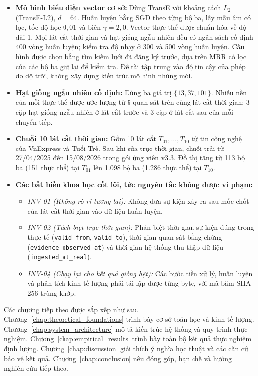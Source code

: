 \begin{itemize}
    \item \textbf{Mô hình biểu diễn vector cơ sở:} Dùng TransE với khoảng cách $L_2$ (TransE-L2), $d=64$. Huấn luyện bằng SGD theo từng bộ ba, lấy mẫu âm có lọc, tốc độ học $0{,}01$ và biên $\gamma = 2{,}0$. Vector thực thể được chuẩn hóa về độ dài 1. Mọi lát cắt thời gian và hạt giống ngẫu nhiên đều có ngân sách cố định 400 vòng huấn luyện; kiểm tra độ nhạy ở 300 và 500 vòng huấn luyện. Cấu hình được chọn bằng tìm kiếm lưới đã đăng ký trước, dựa trên MRR có lọc của các bộ ba giữ lại để kiểm tra. Đề tài tập trung vào độ tin cậy của phép đo độ trôi, không xây dựng kiến trúc mô hình nhúng mới.
    \item \textbf{Hạt giống ngẫu nhiên cố định:} Dùng ba giá trị $\{13, 37, 101\}$. Nhiễu nền của mỗi thực thể được ước lượng từ 6 quan sát trên cùng lát cắt thời gian: 3 cặp hạt giống ngẫu nhiên ở lát cắt trước và 3 cặp ở lát cắt sau của mỗi chuyển tiếp.
    \item \textbf{Chuỗi 10 lát cắt thời gian:} Gồm 10 lát cắt $T_{01}, \dots, T_{10}$ từ tin công nghệ của VnExpress và Tuổi Trẻ. Sau khi sửa trục thời gian, chuỗi trải từ 27/04/2025 đến 15/08/2026 trong gói ứng viên v3.3. Đồ thị tăng từ 113 bộ ba (151 thực thể) tại $T_{01}$ lên 1.098 bộ ba (1.286 thực thể) tại $T_{10}$.
    \item \textbf{Các bất biến khoa học cốt lõi, tức nguyên tắc không được vi phạm:}
    \begin{itemize}
        \item \textit{INV-01 (Không rò rỉ tương lai):} Không đưa sự kiện xảy ra sau mốc chốt của lát cắt thời gian vào dữ liệu huấn luyện.
        \item \textit{INV-02 (Tách biệt trục thời gian):} Phân biệt thời gian sự kiện đúng trong thực tế (\texttt{valid\_from}, \texttt{valid\_to}), thời gian quan sát bằng chứng (\texttt{evidence\_\allowbreak observed\_\allowbreak at}) và thời gian hệ thống thu thập dữ liệu (\texttt{ingested\_\allowbreak at\_\allowbreak real}).
        \item \textit{INV-04 (Chạy lại cho kết quả giống hệt):} Các bước tiền xử lý, huấn luyện và phân tích kinh tế lượng phải tái lập được từng byte, với mã băm SHA-256 trùng khớp.
    \end{itemize}
\end{itemize}

Các chương tiếp theo được sắp xếp như sau. Chương~\ref{chap:theoretical_foundations} trình bày cơ sở toán học và kinh tế lượng. Chương~\ref{chap:system_architecture} mô tả kiến trúc hệ thống và quy trình thực nghiệm. Chương~\ref{chap:empirical_results} trình bày toàn bộ kết quả thực nghiệm định lượng. Chương~\ref{chap:discussion} giải thích ý nghĩa học thuật và các căn cứ bảo vệ kết quả. Chương~\ref{chap:conclusion} nêu đóng góp, hạn chế và hướng nghiên cứu tiếp theo.
